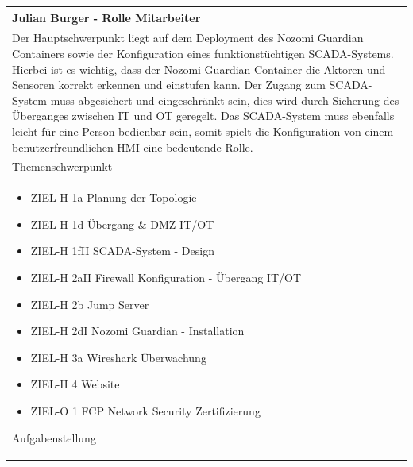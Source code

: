 \documentclass[
	headings=optiontotocandhead,%
	oneside,
	numbers=noenddot,%
	toc=flat, %
	10pt, %
	parskip=full, %
	listof=totoc, %
	listof=flat, %
	numbers=noenddot, %
	bibliography=totoc, %
	a4paper,DIV=14,
]{scrartcl}
\begin{document}
\begin{table}[H]
	\begin{tabularx} {\textwidth} {
			|>{\hsize=1\hsize}X|
		}
		
		\hline
		\rowcolor[HTML]{D9D9D9} 
		\rule{0pt}{15pt}
		\textbf{\normalsize{Julian Burger - Rolle Mitarbeiter}} \\ \hline
		
		\rule{0pt}{20pt}Der Hauptschwerpunkt liegt auf dem Deployment des Nozomi Guardian Containers sowie der Konfiguration eines funktionstüchtigen SCADA-Systems. Hierbei ist es wichtig, dass der Nozomi Guardian Container die Aktoren und Sensoren korrekt erkennen und einstufen kann. Der Zugang zum SCADA-System muss abgesichert und eingeschränkt sein, dies wird durch Sicherung des Überganges zwischen IT und OT geregelt. Das SCADA-System muss ebenfalls leicht für eine Person bedienbar sein, somit spielt die Konfiguration von einem benutzerfreundlichen HMI eine bedeutende Rolle.  \\
		\rule{0pt}{11pt}\textcolor[HTML]{A6A6A6}{\footnotesize{Themenschwerpunkt}} \\ \hline
		
		\begin{itemize}[itemsep=0pt, parsep=0pt, topsep=0pt]
			\item{ZIEL-H 1a Planung der Topologie}
			\item{ZIEL-H 1d Übergang \& DMZ IT/OT}
			\item{ZIEL-H 1fII SCADA-System - Design}
			\item{ZIEL-H 2aII Firewall Konfiguration - Übergang IT/OT}
			\item{ZIEL-H 2b Jump Server}
			\item{ZIEL-H 2dI Nozomi Guardian - Installation}
			\item{ZIEL-H 3a Wireshark Überwachung}
			\item{ZIEL-H 4 Website}
			\item{ZIEL-O 1 FCP Network Security Zertifizierung}
		\end{itemize}
		
		\rule{0pt}{11pt}\textcolor[HTML]{A6A6A6}{\footnotesize{Aufgabenstellung}} \\ \hline
	\end{tabularx}
\end{table}
\end{document}
